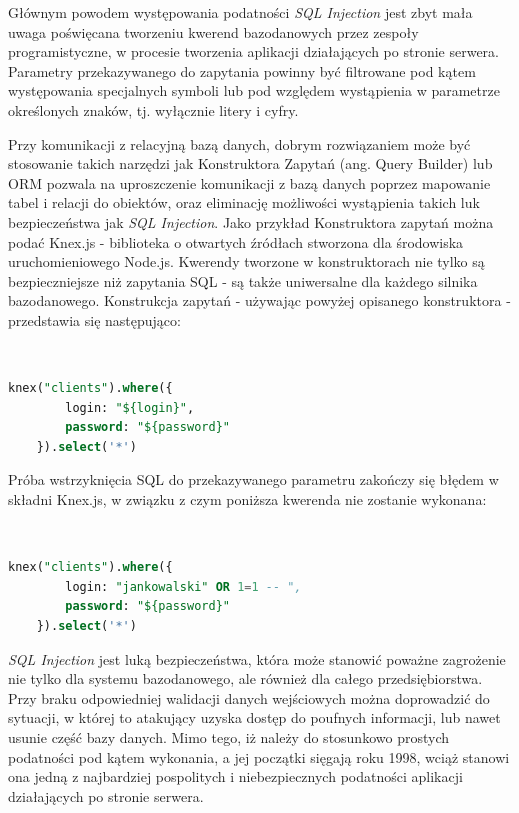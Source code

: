 \documentclass[12pt,twoside]{article}
\begin{document}
Głównym powodem występowania podatności \emph{SQL Injection} jest zbyt mała uwaga poświęcana tworzeniu kwerend bazodanowych przez zespoły programistyczne, w procesie tworzenia aplikacji działających po stronie serwera. Parametry przekazywanego do zapytania powinny być filtrowane pod kątem występowania specjalnych symboli lub pod względem wystąpienia w parametrze określonych znaków, tj. wyłącznie litery i cyfry.

Przy komunikacji z relacyjną bazą danych, dobrym rozwiązaniem może być stosowanie takich narzędzi jak Konstruktora Zapytań (ang. Query Builder) lub ORM pozwala na uproszczenie komunikacji z bazą danych poprzez mapowanie tabel i relacji do obiektów, oraz eliminację możliwości wystąpienia takich luk bezpieczeństwa jak \emph{SQL Injection}. Jako przykład Konstruktora zapytań można podać Knex.js - biblioteka o otwartych źródłach stworzona dla środowiska uruchomieniowego Node.js. Kwerendy tworzone w konstruktorach nie tylko są bezpieczniejsze niż zapytania SQL - są także uniwersalne dla każdego silnika bazodanowego. Konstrukcja zapytań - używając powyżej opisanego konstruktora - przedstawia się następująco:

\

\begin{lstlisting}[language=SQL,caption=Kwerenda bazodanowa stworzona przy użyciu konstruktora zapytań Knex.js,label={KodSQL7}]	
	knex("clients").where({
		login: "${login}",
		password: "${password}"
	}).select('*')
\end{lstlisting}	

Próba wstrzyknięcia SQL do przekazywanego parametru zakończy się błędem w składni Knex.js, w związku z czym poniższa kwerenda nie zostanie wykonana:

\

\begin{lstlisting}[language=SQL,caption=Próba wykonania wstrzyknięcia SQL na konstruktorze zapytań Knex.js ,label={KodSQL8}]	
	knex("clients").where({
		login: "jankowalski" OR 1=1 -- ",
		password: "${password}"
	}).select('*')
\end{lstlisting}	

\emph{SQL Injection} jest luką bezpieczeństwa, która może stanowić poważne zagrożenie nie tylko dla systemu bazodanowego, ale również dla całego przedsiębiorstwa. Przy braku odpowiedniej walidacji danych wejściowych można doprowadzić do sytuacji, w której to atakujący uzyska dostęp do poufnych informacji, lub nawet usunie część bazy danych. Mimo tego, iż należy do stosunkowo prostych podatności pod kątem wykonania, a jej początki sięgają roku 1998, wciąż stanowi ona jedną z najbardziej pospolitych i niebezpiecznych podatności aplikacji działających po stronie serwera.
\end{document}
